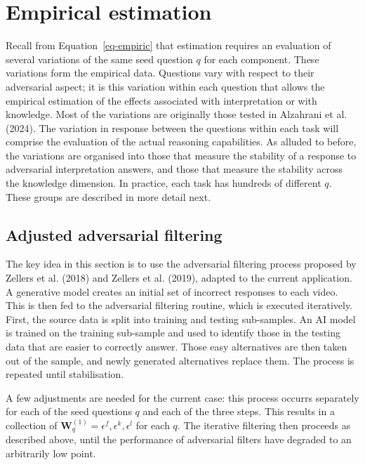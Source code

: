 \documentclass[
]{article}
\begin{document}
\section{Empirical estimation}\label{sec-variation}

Recall from Equation~\ref{eq-empiric} that estimation requires an
evaluation of several variations of the same seed question \(q\) for
each component. These variations form the empirical data. Questions vary
with respect to their adversarial aspect; it is this variation within
each question that allows the empirical estimation of the effects
associated with interpretation or with knowledge. Most of the variations
are originally those tested in Alzahrani et al. (2024). The variation in
response between the questions within each task will comprise the
evaluation of the actual reasoning capabilities. As alluded to before,
the variations are organised into those that measure the stability of a
response to adversarial interpretation answers, and those that measure
the stability across the knowledge dimension. In practice, each task has
hundreds of different \(q\). These groups are described in more detail
next.

\subsection{Adjusted adversarial
filtering}\label{adjusted-adversarial-filtering}

The key idea in this section is to use the adversarial filtering process
proposed by Zellers et al. (2018) and Zellers et al. (2019), adapted to
the current application. A generative model creates an initial set of
incorrect responses to each video. This is then fed to the adversarial
filtering routine, which is executed iteratively. First, the source data
is split into training and testing sub-samples. An AI model is trained
on the training sub-sample and used to identify those in the testing
data that are easier to correctly answer. Those easy alternatives are
then taken out of the sample, and newly generated alternatives replace
them. The process is repeated until stabilisation.

A few adjustments are needed for the current case: this process occurrs
separately for each of the seed questions \(q\) and each of the three
steps. This results in a collection of
\(\mathbf{W}_q^{(1)} = \epsilon^f, \epsilon^k, \epsilon^l\) for each
\(q\). The iterative filtering then proceeds as described above, until
the performance of adversarial filters have degraded to an arbitrarily
low point.
\end{document}

